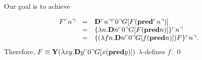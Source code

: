 \begin{pf} \rm
 Our goal is to achieve 

\[
\begin{array}{rcl}
F\ulcorner{n}\urcorner & = & \mathbf{D}\ulcorner{n}\urcorner\ulcorner{0}\urcorner
G[F(\mathbf{pred} \ulcorner{n}\urcorner)] \\
&=  &
\{ \lambda n. \mathbf{D}n\ulcorner{0}\urcorner
G[F(\mathbf{pred} n)] \} \ulcorner{n}\urcorner \\
& = &
\{ (\lambda fn.
 \mathbf{D}n\ulcorner{0}\urcorner
G[f(\mathbf{pred} n)]) F \} \ulcorner{n}\urcorner. \\
\end{array}
\]
Therefore, $F\equiv \mathbf{Y}(\lambda xy.
 \mathbf{D}y\ulcorner{0}\urcorner
G[x(\mathbf{pred} y)])$ $\lambda$-defines $f$.
\qed
\end{pf}
